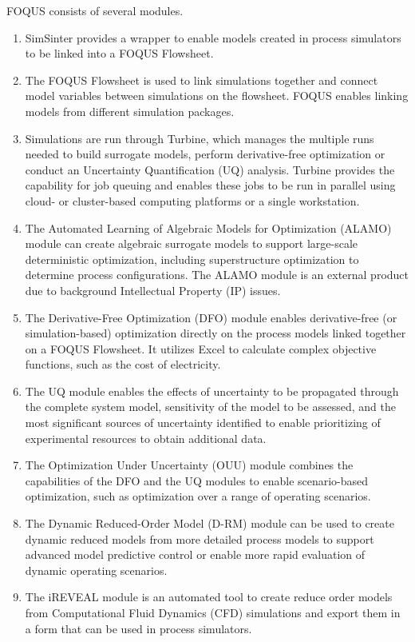 {	FOQUS consists of several modules.
	\begin{enumerate}
		\item SimSinter provides a wrapper to enable models created in process simulators to be linked into a FOQUS Flowsheet.
		\item The FOQUS Flowsheet is used to link simulations together and connect model variables between simulations on the flowsheet. FOQUS enables linking models from different simulation packages.
		\item Simulations are run through Turbine, which manages the multiple runs needed to build surrogate models, perform derivative-free optimization or conduct an Uncertainty Quantification (UQ) analysis. Turbine provides the capability for job queuing and enables these jobs to be run in parallel using cloud- or cluster-based computing platforms or a single workstation.
		\item The Automated Learning of Algebraic Models for Optimization (ALAMO) module can create algebraic surrogate models to support large-scale deterministic optimization, including superstructure optimization to determine process configurations. The ALAMO module is an external product due to background Intellectual Property (IP) issues.
		\item The Derivative-Free Optimization (DFO) module enables derivative-free (or simulation-based) optimization directly on the process models linked together on a FOQUS Flowsheet. It utilizes Excel to calculate complex objective functions, such as the cost of electricity.
		\item The UQ module enables the effects of uncertainty to be propagated through the complete system model, sensitivity of the model to be assessed, and the most significant sources of uncertainty identified to enable prioritizing of experimental resources to obtain additional data.
		\item The Optimization Under Uncertainty (OUU) module combines the capabilities of the DFO and the UQ modules to enable scenario-based optimization, such as optimization over a range of operating scenarios.
		\item The Dynamic Reduced-Order Model (D-RM) module can be used to create dynamic reduced models from more detailed process models to support advanced model predictive control or enable more rapid evaluation of dynamic operating scenarios.
		\item The iREVEAL module is an automated tool to create reduce order models from Computational Fluid Dynamics (CFD) simulations and export them in a form that can be used in process simulators.

\end{enumerate}}
